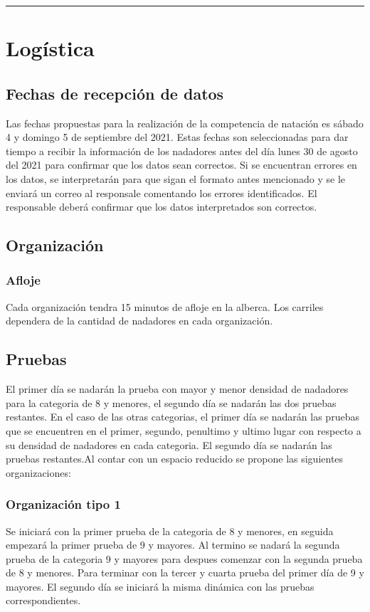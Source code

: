 \hrule
\vspace{0.5cm}
\section{Logística}
\subsection{Fechas de recepción de datos}
Las fechas propuestas para la realización de la competencia de natación es sábado 4 y domingo 5 de septiembre del 2021. Estas fechas son seleccionadas para dar tiempo a recibir la información de los nadadores antes del día lunes 30 de agosto del 2021 para confirmar que los datos sean correctos. Si se encuentran errores en los datos, se interpretarán para que sigan el formato antes mencionado y se le enviará un correo al responsale comentando los errores identificados. El responsable deberá confirmar que los datos interpretados son correctos.

\subsection{Organización}
\subsubsection{Afloje}
Cada organización tendra 15 minutos de afloje en la alberca. Los carriles dependera de la cantidad de nadadores en cada organización.

\subsection{Pruebas}
El primer día se nadarán la prueba con mayor y menor densidad de nadadores para la categoria de 8 y menores, el segundo día se nadarán las dos pruebas restantes. En el caso de las otras categorias, el primer día se nadarán las pruebas que se encuentren en el primer, segundo, penultimo y ultimo lugar con respecto a su densidad de nadadores en cada categoria. El segundo día se nadarán las pruebas restantes.Al contar con un espacio reducido se propone las siguientes organizaciones:

\subsubsection{Organización tipo 1}
Se iniciará con la primer prueba de la categoria de 8 y menores, en seguida empezará la primer prueba de 9 y mayores. Al termino se nadará la segunda prueba de la categoria 9 y mayores para despues comenzar con la segunda prueba de 8 y menores. Para terminar con la tercer y cuarta prueba del primer día de 9 y mayores. El segundo día se iniciará la misma dinámica con las pruebas correspondientes.

